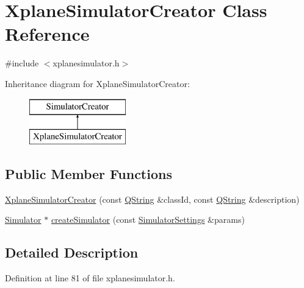 \hypertarget{class_xplane_simulator_creator}{\section{\-Xplane\-Simulator\-Creator \-Class \-Reference}
\label{class_xplane_simulator_creator}
}


{\ttfamily \#include $<$xplanesimulator.\-h$>$}

\-Inheritance diagram for \-Xplane\-Simulator\-Creator\-:\begin{figure}[H]
\begin{center}
\leavevmode
\includegraphics[height=2.000000cm]{class_xplane_simulator_creator}
\end{center}
\end{figure}
\subsection*{\-Public \-Member \-Functions}
\begin{DoxyCompactItemize}
\item 
\hyperlink{class_xplane_simulator_creator_ab847bc2dd23d56e8783386fbfacb21ef}{\-Xplane\-Simulator\-Creator} (const \hyperlink{group___u_a_v_objects_plugin_gab9d252f49c333c94a72f97ce3105a32d}{\-Q\-String} \&class\-Id, const \hyperlink{group___u_a_v_objects_plugin_gab9d252f49c333c94a72f97ce3105a32d}{\-Q\-String} \&description)
\item 
\hyperlink{class_simulator}{\-Simulator} $\ast$ \hyperlink{class_xplane_simulator_creator_af7cd7c69acb5effb7d06e7e9236b4a95}{create\-Simulator} (const \hyperlink{group___h_i_t_l_plugin_ga052199f1328d3002bce3e45345aa7f4e}{\-Simulator\-Settings} \&params)
\end{DoxyCompactItemize}


\subsection{\-Detailed \-Description}


\-Definition at line 81 of file xplanesimulator.\-h.



